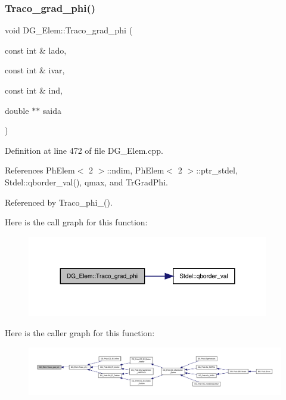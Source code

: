 \mbox{\label{classDG__Elem_a8d090e18204cd99ed11ef8115a95c2e7}} 
\subsubsection{\texorpdfstring{Traco\+\_\+grad\+\_\+phi()}{Traco\_grad\_phi()}}
{\footnotesize\ttfamily void D\+G\+\_\+\+Elem\+::\+Traco\+\_\+grad\+\_\+phi (\begin{DoxyParamCaption}\item[{const int \&}]{lado,  }\item[{const int \&}]{ivar,  }\item[{const int \&}]{ind,  }\item[{double $\ast$$\ast$}]{saida }\end{DoxyParamCaption})}



Definition at line 472 of file D\+G\+\_\+\+Elem.\+cpp.



References Ph\+Elem$<$ 2 $>$\+::ndim, Ph\+Elem$<$ 2 $>$\+::ptr\+\_\+stdel, Stdel\+::qborder\+\_\+val(), qmax, and Tr\+Grad\+Phi.



Referenced by Traco\+\_\+phi\+\_().

Here is the call graph for this function\+:
\nopagebreak
\begin{figure}[H]
\begin{center}
\leavevmode
\includegraphics[width=299pt]{classDG__Elem_a8d090e18204cd99ed11ef8115a95c2e7_cgraph}
\end{center}
\end{figure}
Here is the caller graph for this function\+:
\nopagebreak
\begin{figure}[H]
\begin{center}
\leavevmode
\includegraphics[width=350pt]{classDG__Elem_a8d090e18204cd99ed11ef8115a95c2e7_icgraph}
\end{center}
\end{figure}
\mbox{\label{classDG__Elem_ad288d45acae59787b21a35b38fe47b10}} 
